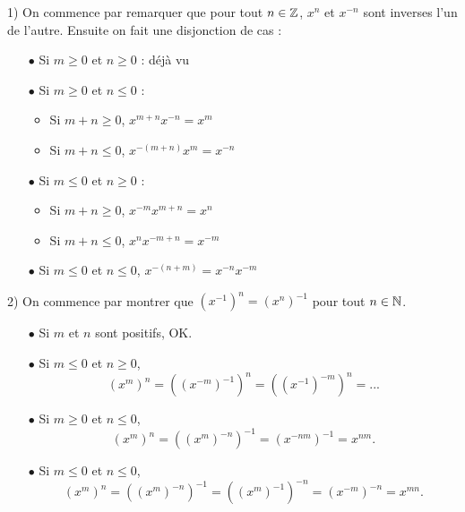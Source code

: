 \documentclass{magnolia}
\begin{document}
\begin{preuve}
 1) On commence par remarquer que pour tout $n\in\mathbb{Z}$, $x^n$ et $x^{-n}$ sont inverses l'un de l'autre. Ensuite on fait une disjonction de cas :
\begin{itemize}
\item[$\bullet$] Si $m\geq 0$ et $n\geq 0$ : déjà vu
\item[$\bullet$] Si $m\geq 0$ et $n\leq 0$ :
\begin{itemize}
\item Si $m+n \geq 0$,
         $x^{m+n} x^{-n} = x^m$
\item Si $m+n \leq 0$,
         $x^{-(m+n)} x^m = x^{-n}$
\end{itemize}
\item[$\bullet$] Si $m\leq 0$ et $n\geq 0$ :
\begin{itemize}
\item Si $m+n \geq  0$,
         $x^{-m}x^{m+n} = x^n$
\item Si $m+n \leq 0$,
         $x^n x^{-{m+n}} = x^{-m}$
\end{itemize}
\item[$\bullet$] Si $m\leq 0$ et $n\leq 0$,
       $x^{-(n+m)}=x^{-n} x^{-m}$
\end{itemize}
 2) On commence par montrer que $(x^{-1})^n=(x^n)^{-1}$ pour tout $n\in\mathbb{N}$.
\begin{itemize}
\item[$\bullet$] Si $m$ et $n$ sont positifs, OK.
\item[$\bullet$] Si $m\leq 0$ et $n\geq 0$,
      $$(x^m)^n = ((x^{-m})^{-1})^n= ((x^{-1})^{-m})^n = ...$$
\item[$\bullet$] Si $m\geq 0$ et $n\leq 0$,
      $$(x^m)^n = ((x^m)^{-n})^{-1}= (x^{-nm})^{-1}= x^{nm} .$$
\item[$\bullet$] Si $m\leq 0$ et $n\leq 0$,
      $$(x^m)^n = ((x^m)^{-n})^{-1}= ((x^m)^{-1})^{-n}= (x^{-m})^{-n}= x^{mn}.$$
\end{itemize}

    \end{preuve}
\end{document}
